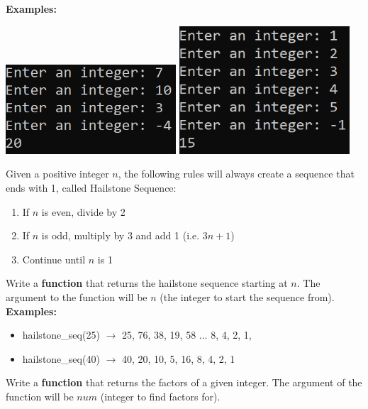 		\textbf{Examples:} \\
		 \begin{center}
		\includegraphics[width = 2.5in]{./imgs/AddCalc2.PNG} \hspace{0.5in} 
		\includegraphics[width = 2.5in]{./imgs/AddCalc1.PNG}
		\end{center}

	\item 
		Given a positive integer $n$, the following rules will always create a sequence that 
		ends with 1, called Hailstone Sequence:
		\begin{enumerate}
			\item If $n$ is even, divide by 2
			\item If $n$ is odd, multiply by 3 and add 1 (i.e. $3n+1$)
			\item Continue until $n$ is 1
		\end{enumerate}
		Write a \textbf{function} that returns the hailstone sequence starting at $n$. 
		The argument to the function will be $n$ (the integer to start the sequence from).
		\textbf{Examples:}		
		\begin{itemize}
			\item  hailstone\_seq(25) $\rightarrow$ 25, 76, 38, 19, 58 ... 8, 4, 2, 1, 
			\item  hailstone\_seq(40) $\rightarrow$ 40, 20, 10, 5, 16, 8, 4, 2, 1
		\end{itemize}



	\item 
		Write a \textbf{function} that returns the factors of a given integer. The argument of the function
		will be $num$ (integer to find factors for).

